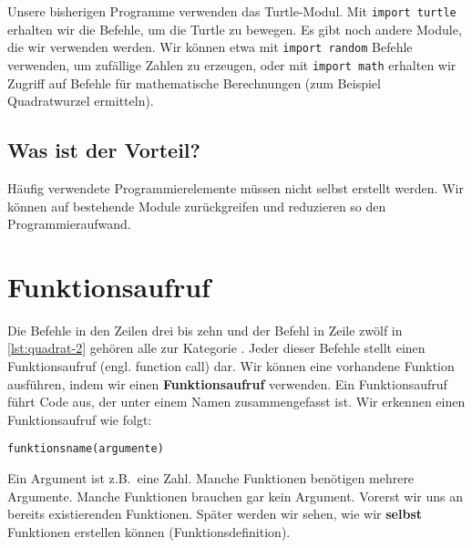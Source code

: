 \begin{example}
    Unsere bisherigen Programme verwenden das Turtle-Modul. Mit \lstinline[language={python3}]{import turtle} erhalten wir die Befehle, um die Turtle zu bewegen. Es gibt noch andere Module, die wir verwenden werden. Wir können etwa mit \lstinline[language={python3}]{import random} Befehle verwenden, um zufällige Zahlen zu erzeugen, oder mit \lstinline[language={python3}]{import math} erhalten wir Zugriff auf Befehle für mathematische Berechnungen (zum Beispiel Quadratwurzel ermitteln).
\end{example}

\subsection{Was ist der Vorteil?} Häufig verwendete Programmierelemente müssen nicht selbst erstellt werden. Wir können auf bestehende Module zurückgreifen und reduzieren so den Programmieraufwand.


\section{Funktionsaufruf}
\label{sec:funktionsaufruf}

Die Befehle in den Zeilen drei bis zehn und der Befehl in Zeile zwölf in \autoref{lst:quadrat-2} gehören alle zur Kategorie . Jeder dieser Befehle stellt einen Funktionsaufruf (engl. function call) dar. Wir können eine vorhandene Funktion ausführen, indem wir einen \textbf{Funktionsaufruf} verwenden. Ein Funktionsaufruf führt Code aus, der unter einem Namen zusammengefasst ist. Wir erkennen einen Funktionsaufruf wie folgt:

\begin{center}
    \lstinline[language={python3}]{funktionsname(argumente)}
\end{center}

Ein Argument ist z.B.\ eine Zahl. Manche Funktionen benötigen mehrere Argumente. Manche Funktionen brauchen gar kein Argument. Vorerst  wir uns an bereits existierenden Funktionen. Später werden wir sehen, wie wir \textbf{selbst} Funktionen erstellen können (Funktionsdefinition).

\begin{figure}[htb]
    \centering
\end{figure}

